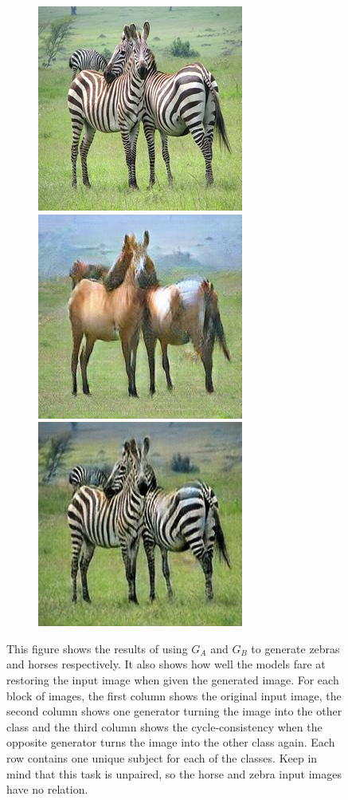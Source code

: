 \documentclass[11pt, fleqn, titlepage]{article}
\newcommand\skipperer{0.45pt}
\newcommand\bigskipx{2.1pt}
\newcommand{\1}[1]{\mathds{1}\left[#1\right]}
\begin{document}
\begin{figure}[H]
\begin{subfigure}[b]{0.8\textwidth}
		\hskip\bigskipx
		\includegraphics[width=0.15\linewidth]{imgs/horse2zebra_cycle/gaussnoise/b-a/51_real_a}
		\hskip\skipperer
		\includegraphics[width=0.15\linewidth]{imgs/horse2zebra_cycle/gaussnoise/b-a/51_fake_b}
		\hskip\skipperer
		\includegraphics[width=0.15\linewidth]{imgs/horse2zebra_cycle/gaussnoise/b-a/51_fake_a}
	\end{subfigure}
	\caption{This figure shows the results of using $G_A$ and $G_B$ to generate zebras and horses respectively. It also shows how well the models fare at restoring the input image when given the generated image. For each block of images, the first column shows the original input image, the second column shows one generator turning the image into the other class and the third column shows the cycle-consistency when the opposite generator turns the image into the other class again. Each row contains one unique subject for each of the classes. Keep in mind that this task is unpaired, so the horse and zebra input images have no relation.}
	\label{fig:testing_cycle_consistency}
\end{figure}
\end{document}
